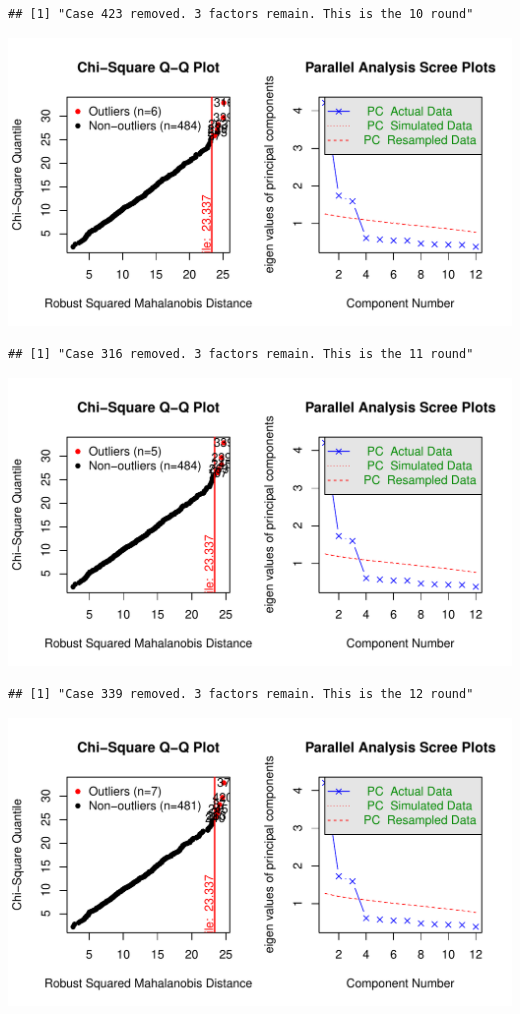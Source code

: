 \documentclass{article}\usepackage[]{graphicx}\usepackage[]{color}
\makeatletter
\def\maxwidth{ %
  \ifdim\Gin@nat@width>\linewidth
    \linewidth
  \else
    \Gin@nat@width
  \fi
}
\newenvironment{kframe}{%
 \def\at@end@of@kframe{}%
 \ifinner\ifhmode%
  \def\at@end@of@kframe{\end{minipage}}%
  \begin{minipage}{\columnwidth}%
 \fi\fi%
 \def\FrameCommand##1{\hskip\@totalleftmargin \hskip-\fboxsep
 \colorbox{shadecolor}{##1}\hskip-\fboxsep
     \hskip-\linewidth \hskip-\@totalleftmargin \hskip\columnwidth}%
 \MakeFramed {\advance\hsize-\width
   \@totalleftmargin\z@ \linewidth\hsize
   \@setminipage}}%
 {\par\unskip\endMakeFramed%
 \at@end@of@kframe}
\newenvironment{knitrout}{}{} %
\makeatother
\begin{document}
\begin{knitrout}
\begin{kframe}\begin{verbatim}
## [1] "Case 423 removed. 3 factors remain. This is the 10 round"
\end{verbatim}
\end{kframe}
\includegraphics[width=\maxwidth]{figure/unnamed-chunk-10-11} 
\begin{kframe}\begin{verbatim}
## [1] "Case 316 removed. 3 factors remain. This is the 11 round"
\end{verbatim}
\end{kframe}
\includegraphics[width=\maxwidth]{figure/unnamed-chunk-10-12} 
\begin{kframe}\begin{verbatim}
## [1] "Case 339 removed. 3 factors remain. This is the 12 round"
\end{verbatim}
\end{kframe}
\includegraphics[width=\maxwidth]{figure/unnamed-chunk-10-13} 

\end{knitrout}
\end{document}
